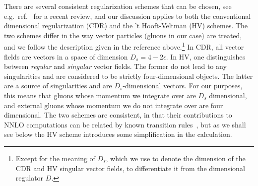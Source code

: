 There are several consistent regularization schemes that can be
chosen, see
e.g.~ref.~\cite{Gnendiger:2017pys} for a recent review, and our
discussion applies to both the conventional
dimensional regularization (CDR) and the 't Hooft-Veltman (HV)
schemes. The two schemes differ in the way
vector particles (gluons in our case) are treated,
and we follow 
the description given in the reference
above.\footnote{Except for the meaning of $D_s$, which we use 
to denote the dimension of the CDR and HV singular vector 
fields, to differentiate it from the dimensional regulator $D$.}
In CDR, all vector fields are vectors in a space of dimension
$D_s=4-2\epsilon$. In
HV, one distinguishes between \emph{regular} and 
\emph{singular} vector 
fields. The former do not lead to any singularities and 
are considered to be
strictly four-dimensional objects. The
latter are a source of singularities and are 
$D_s$-dimensional vectors. For our purposes, this means
that gluons whose momentum we integrate over are 
$D_s$ dimensional, and external gluons whose momentum
we do not integrate over are
four dimensional. The two schemes are consistent,
in that their contributions to NNLO computations can be related by known
transition rules~\cite{Broggio:2015dga}, but as we
shall see below the HV scheme introduces some simplification in
the calculation.


